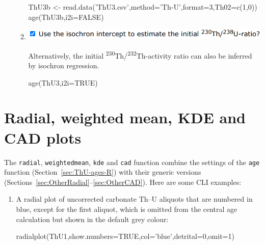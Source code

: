 \begin{refsection}
\begin{enumerate}
\begin{enumerate}
\begin{script}
ThU3b <- read.data('ThU3.csv',method='Th-U',format=3,Th02=c(1,0))
age(ThU3b,i2i=FALSE)
\end{script}

    
\item\begin{minipage}[t]{.7\linewidth}
    \strut\vspace*{-\baselineskip}\newline
    \includegraphics[width=\linewidth]{../figures/ThUi2i.png}
  \end{minipage}
    \begin{minipage}[t]{.3\linewidth}
      Alternatively, the initial
      \textsuperscript{230}Th/\textsuperscript{232}Th-activity ratio
      can also be inferred by isochron regression.\\
    \end{minipage}    

\begin{script}
age(ThU3,i2i=TRUE)
\end{script}
    
  \end{enumerate}
  
\end{enumerate}

\section{Radial, weighted mean, KDE and CAD plots}

The \texttt{radial}, \texttt{weightedmean}, \texttt{kde} and
\texttt{cad} function combine the settings of the \texttt{age}
function (Section~\ref{sec:ThU-ages-R}) with their generic versions
(Sections~\ref{sec:OtherRadial}--\ref{sec:OtherCAD}). Here are some
CLI examples:

\begin{enumerate}

\item A radial plot of uncorrected carbonate Th--U aliquots that are
  numbered in blue, except for the first aliquot, which is omitted
  from the central age calculation but shown in the default grey
  colour:
  
\begin{console}
radialplot(ThU1,show.numbers=TRUE,col='blue',detrital=0,omit=1)
\end{console}


\end{enumerate}
\end{refsection}
